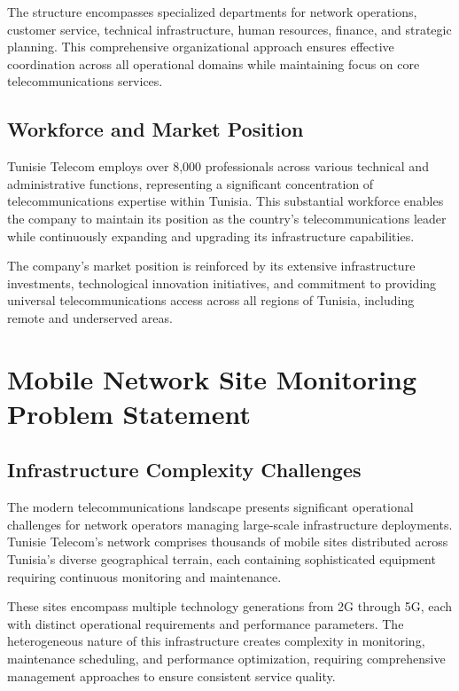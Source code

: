 The structure encompasses specialized departments for network operations, customer service, technical infrastructure, human resources, finance, and strategic planning. This comprehensive organizational approach ensures effective coordination across all operational domains while maintaining focus on core telecommunications services.

\subsection{Workforce and Market Position}

Tunisie Telecom employs over 8,000 professionals across various technical and administrative functions, representing a significant concentration of telecommunications expertise within Tunisia. This substantial workforce enables the company to maintain its position as the country's telecommunications leader while continuously expanding and upgrading its infrastructure capabilities.

The company's market position is reinforced by its extensive infrastructure investments, technological innovation initiatives, and commitment to providing universal telecommunications access across all regions of Tunisia, including remote and underserved areas.

\section{Mobile Network Site Monitoring Problem Statement}

\subsection{Infrastructure Complexity Challenges}

The modern telecommunications landscape presents significant operational challenges for network operators managing large-scale infrastructure deployments. Tunisie Telecom's network comprises thousands of mobile sites distributed across Tunisia's diverse geographical terrain, each containing sophisticated equipment requiring continuous monitoring and maintenance.

These sites encompass multiple technology generations from 2G through 5G, each with distinct operational requirements and performance parameters. The heterogeneous nature of this infrastructure creates complexity in monitoring, maintenance scheduling, and performance optimization, requiring comprehensive management approaches to ensure consistent service quality.

